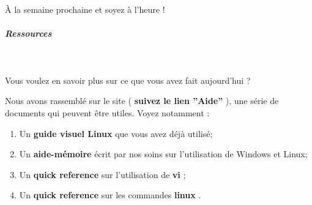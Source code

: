 \documentclass[11pt,a4paper]{article}
\begin{document}
\`A la semaine prochaine et soyez \`a l'heure !

			
		\subparagraph{Ressources} 
		
					\textcolor{white}{.} \par
				
            \par
        
Vous voulez en savoir plus sur ce que vous avez fait aujourd'hui ?

Nous avons rassembl\'e sur le site ( \textbf{suivez le lien ''Aide''} ), une s\'erie de documents qui peuvent \^etre utiles. Voyez notamment :  

					\begin{enumerate}
				
			\item Un  \textbf{guide visuel Linux} que vous avez d\'ej\`a utilis\'e;
			\item Un  \textbf{aide-m\'emoire}  \'ecrit par nos soins sur l'utilisation de Windows et Linux; 
			\item Un  \textbf{quick reference}  sur l'utilisation de  \textbf{vi} ; 
			\item Un  \textbf{quick reference}  sur les commandes  \textbf{linux} . 
					\end{enumerate}
				
				
\end{document}
